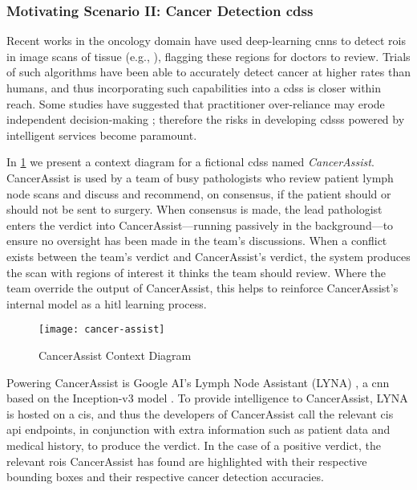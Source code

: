 
\subsubsection{Motivating Scenario II: Cancer Detection \gls{cdss}}
\label{ssec:introduction:motivation:scenario:cancer}

Recent works in the oncology domain have used deep-learning \glspl{cnn} to detect \glspl{roi} in image scans of tissue (e.g., \citep{Liu:2018fa,Haenssle:2018bz,EhteshamiBejnordi:2017kq}), flagging these regions for doctors to review. Trials of such algorithms have been able to accurately detect cancer at higher rates than humans, and thus incorporating such capabilities into a \gls{cdss} is closer within reach. Some studies have suggested that practitioner over-reliance may erode independent decision-making \citep{Jaspers:2011hy,Chambers:1991uh}; therefore the risks in developing \glspl{cdss} powered by intelligent services become paramount.

In \cref{fig:introduction:motivation:scenario:cancer} we present a context diagram for a fictional \gls{cdss} named \textit{CancerAssist}. CancerAssist is used by a team of busy pathologists who review patient lymph node scans and discuss and recommend, on consensus, if the patient should or should not be sent to surgery. When consensus is made, the lead pathologist enters the verdict into CancerAssist---running passively in the background---to ensure no oversight has been made in the team's discussions. When a conflict exists between the team's verdict and CancerAssist's verdict, the system produces the scan with regions of interest it thinks the team should review. Where the team override the output of CancerAssist, this helps to reinforce CancerAssist's internal model as a \gls{hitl} learning process.

\begin{figure}[th]
  \texttt{[image: cancer-assist]}
  \caption{CancerAssist Context Diagram}
  \label{fig:introduction:motivation:scenario:cancer}
\end{figure}

Powering CancerAssist is Google AI's Lymph Node Assistant (LYNA) \citep{Liu:2018fa}, a \gls{cnn} based on the Inception-v3 model \citep{Szegedy:2016ws,Krizhevsky:2012wl}. To provide intelligence to CancerAssist, LYNA is hosted on a \gls{cis}, and thus the developers of CancerAssist call the relevant \gls{cis} \gls{api} endpoints, in conjunction with extra information such as patient data and medical history, to produce the verdict. In the case of a positive verdict, the relevant \glspl{roi} CancerAssist has found are highlighted with their respective bounding boxes and their respective cancer detection accuracies.

